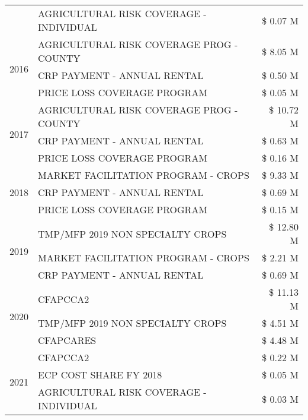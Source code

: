 \begin{tabular}{llr}
 & AGRICULTURAL RISK COVERAGE - INDIVIDUAL & \$ 0.07 M \\
\cline{1-3}
\multirow[t]{3}{*}{2016} & AGRICULTURAL RISK COVERAGE PROG - COUNTY & \$ 8.05 M \\
 & CRP PAYMENT - ANNUAL RENTAL & \$ 0.50 M \\
 & PRICE LOSS COVERAGE PROGRAM & \$ 0.05 M \\
\cline{1-3}
\multirow[t]{3}{*}{2017} & AGRICULTURAL RISK COVERAGE PROG - COUNTY & \$ 10.72 M \\
 & CRP PAYMENT - ANNUAL RENTAL & \$ 0.63 M \\
 & PRICE LOSS COVERAGE PROGRAM & \$ 0.16 M \\
\cline{1-3}
\multirow[t]{3}{*}{2018} & MARKET FACILITATION PROGRAM - CROPS & \$ 9.33 M \\
 & CRP PAYMENT - ANNUAL RENTAL & \$ 0.69 M \\
 & PRICE LOSS COVERAGE PROGRAM & \$ 0.15 M \\
\cline{1-3}
\multirow[t]{3}{*}{2019} & TMP/MFP 2019 NON SPECIALTY CROPS & \$ 12.80 M \\
 & MARKET FACILITATION PROGRAM - CROPS & \$ 2.21 M \\
 & CRP PAYMENT - ANNUAL RENTAL & \$ 0.69 M \\
\cline{1-3}
\multirow[t]{3}{*}{2020} & CFAPCCA2 & \$ 11.13 M \\
 & TMP/MFP 2019 NON SPECIALTY CROPS & \$ 4.51 M \\
 & CFAPCARES & \$ 4.48 M \\
\cline{1-3}
\multirow[t]{3}{*}{2021} & CFAPCCA2 & \$ 0.22 M \\
 & ECP COST SHARE FY 2018 & \$ 0.05 M \\
 & AGRICULTURAL RISK COVERAGE - INDIVIDUAL & \$ 0.03 M \\
\cline{1-3}
\bottomrule
\end{tabular}
